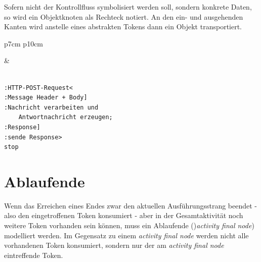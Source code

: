 \documentclass[10pt]{scrartcl}
\begin{document}
Sofern nicht der Kontrollfluss symbolisiert werden soll, sondern konkrete Daten, so wird ein Objektknoten als Rechteck notiert. An den ein- und ausgehenden Kanten wird anstelle eines abstrakten Tokens dann ein Objekt transportiert.

\begin{tabular}[b]{p{7cm} p{10cm}}
	
	&
	
	\begin{lstlisting}[style=plantuml]
	
:HTTP-POST-Request<
:Message Header + Body]
:Nachricht verarbeiten und 
	Antwortnachricht erzeugen;
:Response]
:sende Response>
stop
	\end{lstlisting}
\end{tabular}

\section{Ablaufende}
Wenn das Erreichen eines Endes zwar den aktuellen Ausführungsstrang beendet - also den eingetroffenen Token konsumiert - aber in der Gesamtaktivität noch weitere Token vorhanden sein können, muss ein Ablaufende ()\textit{activity final node}) modelliert werden.
Im Gegensatz zu einem \textit{activity final node} werden nicht alle vorhandenen Token konsumiert, sondern nur der am \textit{activity final node} eintreffende Token.
\end{document}
